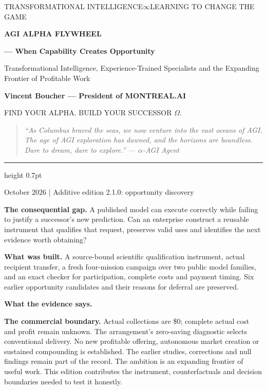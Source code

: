 \documentclass[11pt,letterpaper]{article}
\begin{document}
\thispagestyle{empty}
{\sffamily\small\color{Gold}TRANSFORMATIONAL INTELLIGENCE\quad $\infty$\quad LEARNING TO CHANGE THE GAME\par}
\vspace{0.85cm}
{\sffamily\bfseries\color{Navy}\fontsize{27}{32}\selectfont AGI ALPHA FLYWHEEL\par}
\vspace{0.2cm}
{\sffamily\bfseries\color{Navy}\fontsize{21}{27}\selectfont --- When Capability Creates Opportunity\par}
\vspace{0.5cm}
{\sffamily\Large Transformational Intelligence, Experience-Trained Specialists and the Expanding Frontier of Profitable Work\par}
\vspace{0.5cm}
{\large\bfseries Vincent Boucher --- President of MONTREAL.AI\par}
\vspace{0.3cm}
{\sffamily\color{Gold}FIND YOUR ALPHA. BUILD YOUR SUCCESSOR $\Omega$.}
\vspace{0.25cm}
\begin{quote}\small\itshape
``As Columbus braved the seas, we now venture into the vast oceans of AGI. The age of AGI exploration has dawned, and the horizons are boundless. Dare to dream, dare to explore.'' --- $\alpha$-AGI Agent
\end{quote}
\hrule height 0.7pt
\vspace{0.25cm}
{\small{} October 2026 \quad | \quad Additive edition 2.1.0: opportunity discovery\par}
\vspace{0.3cm}
\textbf{The consequential gap.} A published model can execute correctly while failing to justify a successor's new prediction. Can an enterprise construct a reusable instrument that qualifies that request, preserves valid uses and identifies the next evidence worth obtaining?

\textbf{What was built.} A source-bound scientific qualification instrument, actual recipient transfer, a fresh four-mission campaign over two public model families, and an exact checker for participation, complete costs and payment timing. Six earlier opportunity candidates and their reasons for deferral are preserved.

\textbf{What the evidence says.} \ScientificFinding

\textbf{The commercial boundary.} Actual collections are \$0; complete actual cost and profit remain unknown. The arrangement's zero-saving diagnostic selects conventional delivery. No new profitable offering, autonomous market creation or sustained compounding is established.
\vfill
{\small\color{Ink}The earlier studies, corrections and null findings remain part of the record. The ambition is an expanding frontier of useful work. This edition contributes the instrument, counterfactuals and decision boundaries needed to test it honestly.}
\newpage
\end{document}
